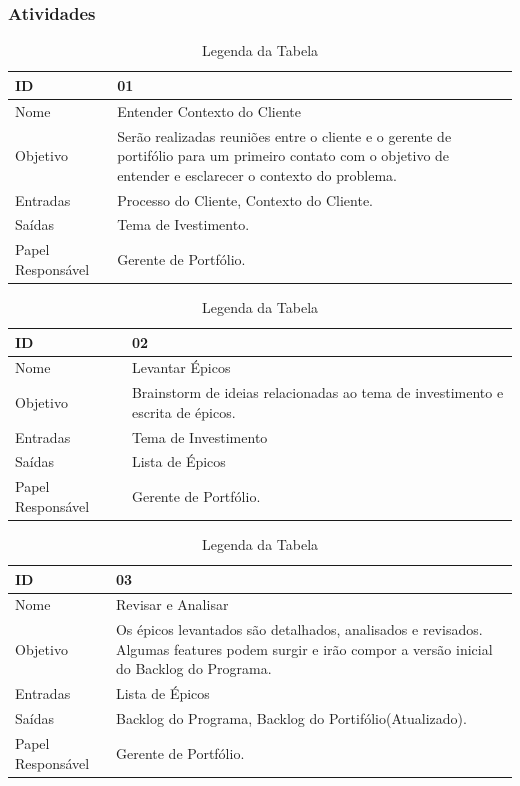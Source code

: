 \subsubsection{Atividades}

  \begin{table}[H]
    \centering
      \begin{tabular}{| m{5em} | m{10cm} |}
        \hline
        ID       & 01   \\ \hline
        Nome     & Entender Contexto do Cliente   \\ \hline
        Objetivo & Serão realizadas reuniões entre o cliente e o gerente de portifólio para um primeiro contato com o objetivo de entender e esclarecer o contexto do problema. \\ \hline
        Entradas & Processo do Cliente, Contexto do Cliente.   \\ \hline
        Saídas   & Tema de Ivestimento. \\ \hline
        Papel Responsável   & Gerente de Portfólio. \\ \hline
      \end{tabular}
      \caption{Legenda da Tabela}
      \label{tabela:atividade1}
  \end{table}

  \begin{table}[H]
    \centering
      \begin{tabular}{| m{5em} | m{10cm} |}
        \hline
        ID       & 02   \\ \hline
        Nome     & Levantar Épicos   \\ \hline
        Objetivo & Brainstorm de ideias relacionadas ao tema de investimento e escrita de épicos. \\ \hline
        Entradas & Tema de Investimento   \\ \hline
        Saídas   & Lista de Épicos \\ \hline
        Papel Responsável   & Gerente de Portfólio. \\ \hline
      \end{tabular}
      \caption{Legenda da Tabela}
      \label{tabela:atividade2}
  \end{table}

  \begin{table}[H]
    \centering
      \begin{tabular}{| m{5em} | m{10cm} |}
        \hline
        ID       & 03   \\ \hline
        Nome     & Revisar e Analisar   \\ \hline
        Objetivo & Os épicos levantados são detalhados, analisados e revisados. Algumas features podem surgir e irão compor a versão inicial do Backlog do Programa. \\ \hline
        Entradas & Lista de Épicos   \\ \hline
        Saídas   & Backlog do Programa, Backlog do Portifólio(Atualizado). \\ \hline
        Papel Responsável   & Gerente de Portfólio. \\ \hline
      \end{tabular}
      \caption{Legenda da Tabela}
      \label{tabela:atividade3}
  \end{table}

